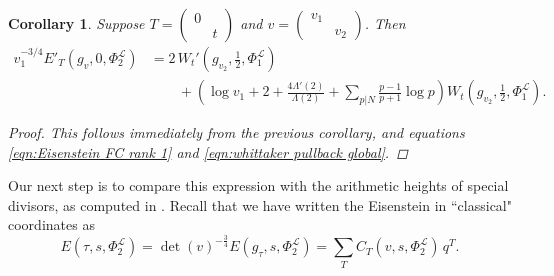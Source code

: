 \documentclass[reqno,oneside]{amsart}
\theoremstyle{plain}
\newtheorem{corollary}[theorem]{Corollary}
\theoremstyle{remark}
\numberwithin{theorem}{section}
\newcommand{\calL}{\mathcal L}
\newcommand{\psm}[1]{\left( \begin{smallmatrix}#1 \end{smallmatrix} \right)}
\begin{document}
	
	\begin{corollary} \label{cor:rank 1 Eis coeff}
		Suppose $T = \psm{0 & \\ & t}$ and $v = \psm{v_1 & \\ & v_2}$. Then
		\begin{equation}
		\begin{aligned}
		v_1^{-3/4}	E'_T(g_v, 0, \Phi_2^{\calL}) &=  2 \, W_t'(g_{v_2}, \tfrac 12, \Phi^{\calL}_1)  \\
		& \qquad + \left( \log v_1 + 2 +  \frac{4\Lambda'(2)}{\Lambda(2)}  + \sum_{p|N} \frac{p-1}{p+1} \log p \right) W_t(g_{v_2}, \tfrac12, \Phi^{\calL}_1).
		\end{aligned}
		\end{equation}
		\begin{proof}
			This follows immediately from the previous corollary, and equations  \eqref{eqn:Eisenstein FC rank 1} and \eqref{eqn:whittaker pullback global}.
			
		\end{proof}
	\end{corollary}
	
	Our next step is to compare this expression with the arithmetic heights of special divisors, as computed in \cite{DuYang}.
	Recall that we have written the Eisenstein in ``classical" coordinates as
	\begin{equation}
	E(\tau, s, \Phi^{\calL}_2) = \det(v)^{-\frac34} E(g_{\tau}, s, \Phi^{\calL}_2) = \sum_T  C_T(v, s, \Phi_2^{\calL}) \, q^T.
	\end{equation}
	
\end{document}
